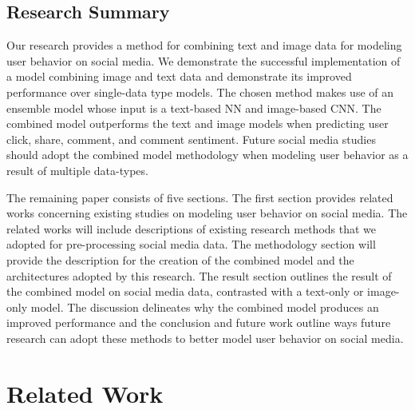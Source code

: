 \documentclass{article}
\begin{document}

\subsection{Research Summary}

Our research provides a method for combining text and image data for modeling user behavior on social media. We demonstrate the successful implementation of a model combining image and text data and demonstrate its improved performance over single-data type models. The chosen method makes use of an ensemble model whose input is a text-based NN and image-based CNN. The combined model outperforms the text and image models when predicting user click, share, comment, and comment sentiment. Future social media studies should adopt the combined model methodology when modeling user behavior as a result of multiple data-types.

The remaining paper consists of five sections.  The first section provides related works concerning existing studies on modeling user behavior on social media. The related works will include descriptions of existing research methods that we adopted for pre-processing social media data.  The methodology section will provide the description for the creation of the combined model and the architectures adopted by this research. The result section outlines the result of the combined model on social media data, contrasted with a text-only or image-only model.  The discussion delineates why the combined model produces an improved performance and the conclusion and future work outline ways future research can adopt these methods to better model user behavior on social media.

\section{Related Work}
\end{document}

